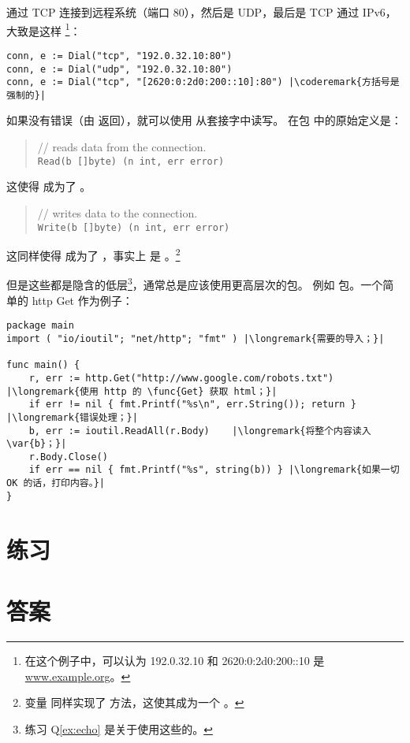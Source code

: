 通过 TCP 连接到远程系统（端口 80），然后是 UDP，最后是 TCP 通过 IPv6，大致是这样
\footnote{在这个例子中，可以认为 192.0.32.10 和 2620:0:2d0:200::10 是 \url{www.example.org}。}：
\begin{lstlisting}
conn, e := Dial("tcp", "192.0.32.10:80")
conn, e := Dial("udp", "192.0.32.10:80")
conn, e := Dial("tcp", "[2620:0:2d0:200::10]:80") |\coderemark{方括号是强制的}|
\end{lstlisting}

如果没有错误（由  返回），就可以使用  从套接字中读写。
在包  中的原始定义是：
\begin{quote}
//  reads data from the connection.\\
\lstinline{Read(b []byte) (n int, err error)}
\end{quote}
这使得  成为了 。

\begin{quote}
//  writes data to the connection.\\
\lstinline{Write(b []byte) (n int, err error)}
\end{quote}
这同样使得  成为了 ，事实上  是 。\footnote{变量  同样实现了  方法，这使其成为一个 。}

但是这些都是隐含的低层\footnote{练习 Q\ref{ex:echo} 是关于使用这些的。}，通常总是应该使用更高层次的包。
例如  包。一个简单的 http Get 作为例子：
\begin{lstlisting}
package main
import ( "io/ioutil"; "net/http"; "fmt" ) |\longremark{需要的导入；}|

func main() {
    r, err := http.Get("http://www.google.com/robots.txt") |\longremark{使用 http 的 \func{Get} 获取 html；}|
    if err != nil { fmt.Printf("%s\n", err.String()); return } |\longremark{错误处理；}|
    b, err := ioutil.ReadAll(r.Body)    |\longremark{将整个内容读入 \var{b}；}|
    r.Body.Close()  
    if err == nil { fmt.Printf("%s", string(b)) } |\longremark{如果一切 OK 的话，打印内容。}|
}
\end{lstlisting}
\showremarks

\section{练习}














\cleardoublepage
\section{答案}
\shipoutAnswer
